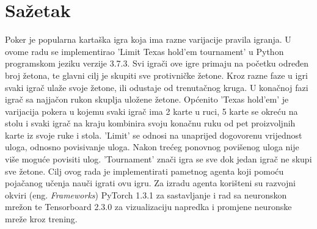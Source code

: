 \section*{Sažetak}
\label{sec:summary}
Poker je popularna kartaška igra koja ima razne varijacije pravila igranja. U ovome radu se implementirao 'Limit Texas hold'em tournament' u Python programskom jeziku verzije 3.7.3. Svi igrači ove igre primaju na početku određen broj žetona, te glavni cilj je skupiti sve protivničke žetone. Kroz razne faze u igri svaki igrač ulaže svoje žetone, ili odustaje od trenutačnog kruga. U konačnoj fazi igrač sa najjačon rukon skuplja uložene žetone. Općenito 'Texas hold'em' je varijacija pokera u kojemu svaki igrač ima 2 karte u ruci, 5 karte se okreću na stolu i svaki igrač na kraju kombinira svoju konačnu ruku od pet proizvoljnih karte iz svoje ruke i stola. 'Limit' se odnosi na unaprijed dogovorenu vrijednost uloga, odnosno povisivanje uloga. Nakon trećeg ponovnog povišenog uloga nije više moguće povisiti ulog. 'Tournament' znači igra se sve dok jedan igrač ne skupi sve žetone. Cilj ovog rada je implementirati pametnog agenta koji pomoću pojačanog učenja nauči igrati ovu igru. Za izradu agenta korišteni su razvojni okviri (eng. \textit{Frameworks}) PyTorch 1.3.1 za sastavljanje i rad sa neuronskon mrežon te Tensorboard 2.3.0 za vizualizaciju napredka i promjene neuronske mreže kroz trening.